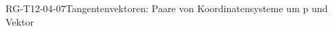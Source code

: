 
\begin{DEF}{RG-T12-04-07}{Tangentenvektoren: Paare von Koordinatensysteme um p und Vektor}
\end{DEF}
